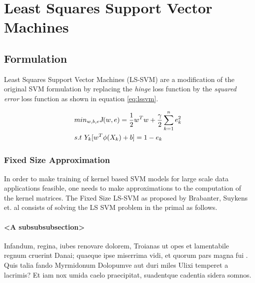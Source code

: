\documentclass[
    ,final            %
  ]
  {aipproc}
\begin{document}
\section{Least Squares Support Vector Machines}

\subsection{Formulation}
 
Least Squares Support Vector Machines (LS-SVM) \cite{Suykens1999} are a modification of the original SVM formulation by replacing the \textit{hinge} loss function by the \textit{squared error} loss function as shown in equation \ref{eq:lssvm}. 

\begin{align*}
& min_{w,b,e}\textsl{J}(w,e) = \frac{1}{2}w^{T} w + \frac{\gamma}{2}\sum^{n}_{k=1}e_k^{2} \\   
& s.t \ Y_{k}[w^{T} \phi(X_k) + b] = 1 - e_{k} \label{eq:lssvm}
\end{align*}


\subsubsection{Fixed Size Approximation}

In order to make training of kernel based SVM models for large scale data applications feasible, one needs to make approximations to the computation of the kernel matrices. The Fixed Size LS-SVM as proposed by Brabanter, Suykens et. al \cite{DeBrabanter2010} consists of solving the LS SVM problem in the primal as follows.



\paragraph{<A subsubsubsection>}

Infandum, regina, iubes renovare dolorem, Troianas ut opes et
lamentabile regnum cruerint Danai; quaeque ipse miserrima vidi, et
quorum pars magna fui \cite{Suykens2002}. Quis talia fando
Myrmidonum Dolopumve aut duri miles Ulixi temperet
\cite{Suykens2002} a lacrimis? Et iam
nox umida caelo praecipitat, suadentque \cite{Suykens2002} cadentia
sidera somnos.

\end{document}
